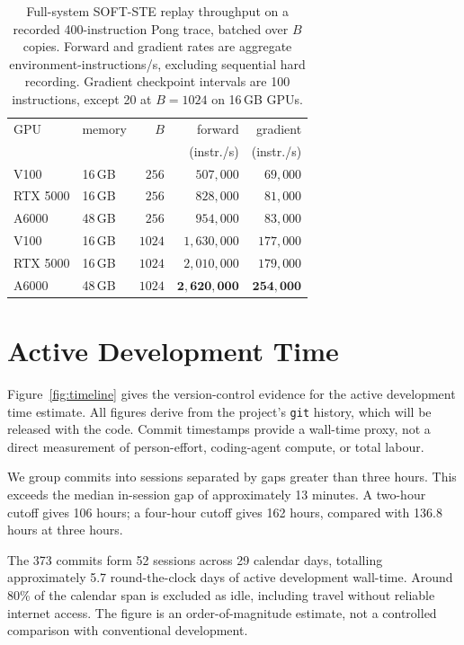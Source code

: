 \documentclass[letterpaper]{article} %
\begin{document}
\begin{table}[tb]
\centering
\caption{Full-system SOFT-STE replay throughput on
a recorded 400-instruction Pong trace, batched over
$B$ copies. Forward and gradient rates are aggregate
environment-instructions/s, excluding sequential hard
recording. Gradient checkpoint intervals are 100
instructions, except 20 at $B=1024$ on 16\,GB GPUs.}
\label{tab:s-replay}
\small
\setlength{\tabcolsep}{5pt}
\begin{tabular}{llrrr}
\toprule
GPU & memory & $B$ & forward & gradient\\
 & & & (instr./s) & (instr./s)\\
\midrule
V100     & 16\,GB & $256$  & $507{,}000$ & $69{,}000$\\
RTX 5000 & 16\,GB & $256$  & $828{,}000$ & $81{,}000$\\
A6000    & 48\,GB & $256$  & $954{,}000$ & $83{,}000$\\
\addlinespace
V100     & 16\,GB & $1024$ & $1{,}630{,}000$ & $177{,}000$\\
RTX 5000 & 16\,GB & $1024$ & $2{,}010{,}000$ & $179{,}000$\\
A6000    & 48\,GB & $1024$ & $\mathbf{2{,}620{,}000}$ & $\mathbf{254{,}000}$\\
\bottomrule
\end{tabular}
\end{table}

\section{Active Development Time}

Figure~\ref{fig:timeline} gives the version-control
evidence for the active development time estimate.
All figures derive from the project's \texttt{git}
history, which will be released with the code.
Commit timestamps provide a wall-time proxy,
not a direct measurement of person-effort,
coding-agent compute, or total labour.

We group commits into sessions separated by
gaps greater than three hours. This exceeds
the median in-session gap of approximately
13 minutes. A two-hour cutoff gives 106 hours;
a four-hour cutoff gives 162 hours, compared
with 136.8 hours at three hours.

The 373 commits form 52 sessions across 29
calendar days, totalling approximately 5.7
round-the-clock days of active development
wall-time. Around 80\% of the calendar span
is excluded as idle, including travel without
reliable internet access. The figure is an
order-of-magnitude estimate, not a controlled
comparison with conventional development.
\end{document}
